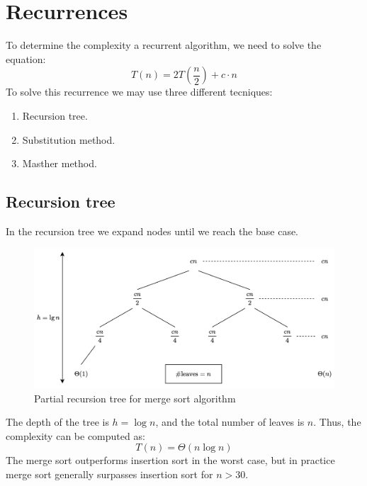 \section{Recurrences}

To determine the complexity a recurrent algorithm, we need to solve the equation:
\[T(n)=2T\left(\frac{n}{2}\right)+c\cdot n\]
To solve this recurrence we may use three different tecniques: 
\begin{enumerate}
    \item Recursion tree.
    \item Substitution method.
    \item Masther method. 
\end{enumerate}

\subsection{Recursion tree}
In the recursion tree we expand nodes until we reach the base case. 
\begin{figure}[H]
    \centering
    \includegraphics[width=0.75\linewidth]{images/tree.png}
    \caption{Partial recursion tree for merge sort algorithm}
\end{figure}
The depth of the tree is $h=\log n$, and the total number of leaves is $n$. 
Thus, the complexity can be computed as:
\[T(n)=\Theta(n\log n)\]
The merge sort outperforms insertion sort in the worst case, but in practice merge sort generally surpasses insertion sort for $n > 30$.

